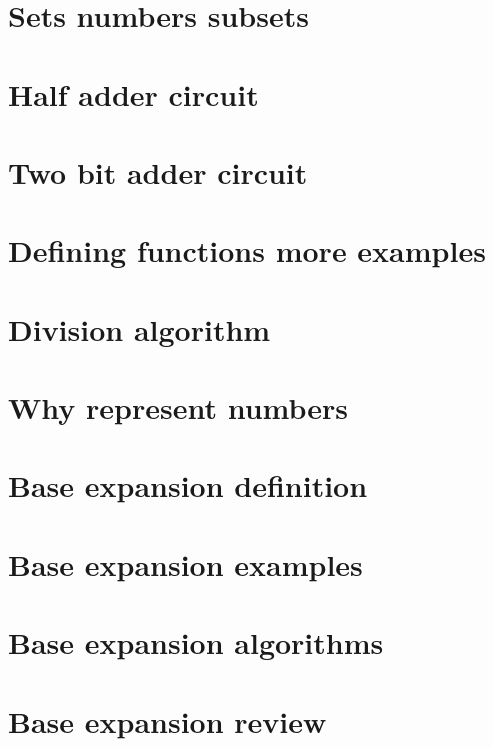
\section*{Sets numbers subsets}

\vfill
\section*{Half adder circuit}

\vfill
\section*{Two bit adder circuit}

\vfill
\section*{Defining functions more examples}

\vfill
\section*{Division algorithm}

\vfill
\section*{Why represent numbers}

\vfill
\section*{Base expansion definition}

\vfill
\section*{Base expansion examples}

\vfill
\section*{Base expansion algorithms}

\vfill
\section*{Base expansion review}

\vfill
